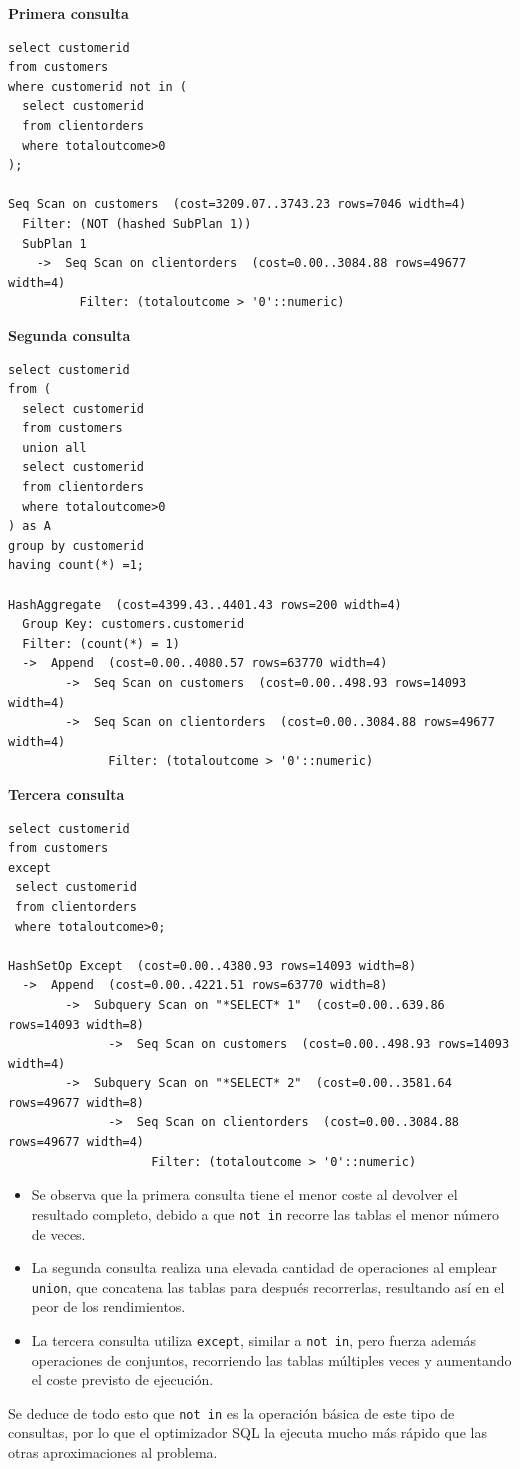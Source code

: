 \documentclass{article}
\begin{document}
\medbreak
\textbf{Primera consulta}
\vspace{-1mm}
\begin{lstlisting}
select customerid
from customers
where customerid not in (
  select customerid
  from clientorders
  where totaloutcome>0
);

Seq Scan on customers  (cost=3209.07..3743.23 rows=7046 width=4)
  Filter: (NOT (hashed SubPlan 1))
  SubPlan 1
    ->  Seq Scan on clientorders  (cost=0.00..3084.88 rows=49677 width=4)
          Filter: (totaloutcome > '0'::numeric)
\end{lstlisting}
\textbf{Segunda consulta}
\vspace{-1mm}
\begin{lstlisting}
select customerid
from (
  select customerid
  from customers
  union all
  select customerid
  from clientorders
  where totaloutcome>0
) as A
group by customerid
having count(*) =1;

HashAggregate  (cost=4399.43..4401.43 rows=200 width=4)
  Group Key: customers.customerid
  Filter: (count(*) = 1)
  ->  Append  (cost=0.00..4080.57 rows=63770 width=4)
        ->  Seq Scan on customers  (cost=0.00..498.93 rows=14093 width=4)
        ->  Seq Scan on clientorders  (cost=0.00..3084.88 rows=49677 width=4)
              Filter: (totaloutcome > '0'::numeric)
\end{lstlisting}
\textbf{Tercera consulta}
\vspace{-1mm}
\begin{lstlisting}
select customerid
from customers
except
 select customerid
 from clientorders
 where totaloutcome>0;

HashSetOp Except  (cost=0.00..4380.93 rows=14093 width=8)
  ->  Append  (cost=0.00..4221.51 rows=63770 width=8)
        ->  Subquery Scan on "*SELECT* 1"  (cost=0.00..639.86 rows=14093 width=8)
              ->  Seq Scan on customers  (cost=0.00..498.93 rows=14093 width=4)
        ->  Subquery Scan on "*SELECT* 2"  (cost=0.00..3581.64 rows=49677 width=8)
              ->  Seq Scan on clientorders  (cost=0.00..3084.88 rows=49677 width=4)
                    Filter: (totaloutcome > '0'::numeric)
\end{lstlisting}
\newpage
\begin{itemize}
    \item Se observa que la primera consulta tiene el menor coste al devolver el resultado completo, debido a que \texttt{not in} recorre las tablas el menor número de veces.
    \item La segunda consulta realiza una elevada cantidad de operaciones al emplear \texttt{union}, que concatena las tablas para después recorrerlas, resultando así en el peor de los rendimientos.
    \item La tercera consulta utiliza \texttt{except}, similar a \texttt{not in}, pero fuerza además operaciones de conjuntos, recorriendo las tablas múltiples veces y aumentando el coste previsto de ejecución.
\end{itemize}
Se deduce de todo esto que \texttt{not in} es la operación básica de este tipo de consultas, por lo que el optimizador SQL la ejecuta mucho más rápido que las otras aproximaciones al problema.
\end{document}
